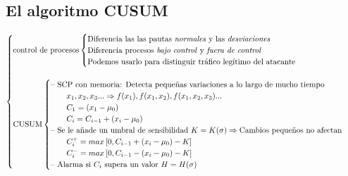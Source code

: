 \begin{Resumen}
\subsection*{El algoritmo CUSUM}
\begin{displaymath}
\begin{cases}
 \text{control de procesos}
 \begin{cases}
  \text{Diferencia las las pautas \emph{normales} y las \emph{desviaciones}}\\
  \text{Diferencia procesos \emph{bajo control} y \emph{fuera de control}}   \\
  \text{Podemos usarlo para distinguir tráfico legítimo del atacante}
 \end{cases}\\\\

 \text{CUSUM}
 \begin{cases}
  \text{-- SCP con memoria: Detecta pequeñas variaciones a lo largo de mucho tiempo} \\ 
  \qquad x_1,x_2,x_3... \Rightarrow f(x_1),f(x_1,x_2),f(x_1,x_2,x_3)... \\
  \qquad C_1 = (x_1 - \mu_0) \\
  \qquad C_i = C_{i-1} + \left(x_i-\mu_0\right) \\
  \text{-- Se le añade un umbral de sensibilidad $K = K(\sigma)$}\Rightarrow\text{Cambios pequeños no afectan} \\
  \qquad C_i^+ = max\left[0, C_{i-1} + \left(x_i-\mu_0\right)- K\right]\\
  \qquad C_i^- = max\left[0, C_{i-1} - \left(x_i-\mu_0\right)- K\right]\\
  \text{-- Alarma si $C_i$ supera un valor $H = H(\sigma)$} \\
 \end{cases}
\end{cases}
\end{displaymath}


\end{Resumen}
